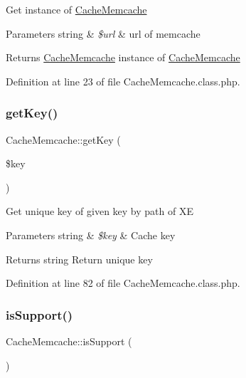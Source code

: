 Get instance of \hyperlink{classCacheMemcache}{Cache\+Memcache}


\begin{DoxyParams}[1]{Parameters}
string & {\em \$url} & url of memcache \\
\hline
\end{DoxyParams}
\begin{DoxyReturn}{Returns}
\hyperlink{classCacheMemcache}{Cache\+Memcache} instance of \hyperlink{classCacheMemcache}{Cache\+Memcache} 
\end{DoxyReturn}


Definition at line 23 of file Cache\+Memcache.\+class.\+php.

\mbox{\label{classCacheMemcache_a27f400a936cc3efb152acc12edb379e1}} 
\subsubsection{\texorpdfstring{get\+Key()}{getKey()}}
{\footnotesize\ttfamily Cache\+Memcache\+::get\+Key (\begin{DoxyParamCaption}\item[{}]{\$key }\end{DoxyParamCaption})}

Get unique key of given key by path of XE


\begin{DoxyParams}[1]{Parameters}
string & {\em \$key} & Cache key \\
\hline
\end{DoxyParams}
\begin{DoxyReturn}{Returns}
string Return unique key 
\end{DoxyReturn}


Definition at line 82 of file Cache\+Memcache.\+class.\+php.

\mbox{\label{classCacheMemcache_a4ea35bdd7cc26faa01996dbbc162720f}} 
\subsubsection{\texorpdfstring{is\+Support()}{isSupport()}}
{\footnotesize\ttfamily Cache\+Memcache\+::is\+Support (\begin{DoxyParamCaption}{ }\end{DoxyParamCaption})}

